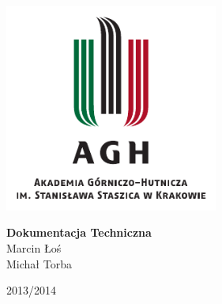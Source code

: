 
\begin{titlepage}
  \begin{center} 

    \includegraphics[width=7cm]{images/agh_logo}
    \vspace{0.5cm}

    {\Huge \textbf{Dokumentacja Techniczna}}
    \\
    \vspace{1cm}
    Marcin Łoś \\
    Michał Torba

    \vfill
    2013\slash 2014

  \end{center}
\end{titlepage}

